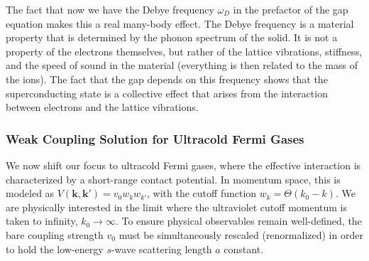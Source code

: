 The fact that now we have the Debye frequency \( \omega_D \) in the prefactor of the gap equation makes this a real many-body effect. The Debye frequency is a material property that is determined by the phonon spectrum of the solid. It is not a property of the electrons themselves, but rather of the lattice vibrations, stiffness, and the speed of sound in the material (everything is then related to the mass of the ions). The fact that the gap depends on this frequency shows that the superconducting state is a collective effect that arises from the interaction between electrons and the lattice vibrations.

\subsubsection{Weak Coupling Solution for Ultracold Fermi Gases}

We now shift our focus to ultracold Fermi gases, where the effective interaction is characterized by a short-range contact potential. In momentum space, this is modeled as \( V(\mathbf{k}, \mathbf{k}') = v_0 w_k w_{k'} \), with the cutoff function \( w_k = \Theta(k_0 - k) \). We are physically interested in the limit where the ultraviolet cutoff momentum is taken to infinity, \( k_0 \to \infty \). To ensure physical observables remain well-defined, the bare coupling strength \( v_0 \) must be simultaneously rescaled (renormalized) in order to hold the low-energy \( s \)-wave scattering length \( a \) constant.


